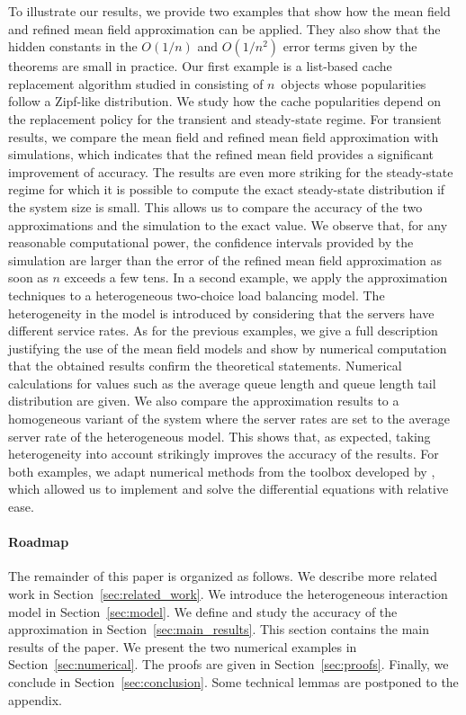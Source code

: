 \documentclass[acmsmall]{acmart}
\begin{document}
To illustrate our results, we provide two examples that show how the mean field and refined mean field approximation can be applied. They also show that the hidden constants in the $O(1/n)$ and $O(1/n^2)$ error terms given by the theorems are small in practice. Our first example is a list-based cache replacement algorithm studied in \cite{gastTransientSteadystateRegime2015} consisting of $n$~objects whose popularities follow a Zipf-like distribution. We study how the cache popularities depend on the replacement policy for the transient and steady-state regime. For transient results, we compare the mean field and refined mean field approximation with simulations, which indicates that the refined mean field provides a significant improvement of accuracy. The results are even more striking for the steady-state regime for which it is possible to compute the exact steady-state distribution if the system size is small. This allows us to compare the accuracy of the two approximations and the simulation to the exact value. We observe that, for any reasonable computational power, the confidence intervals provided by the simulation are larger than the error of the refined mean field approximation as soon as $n$ exceeds a few tens. In a second example, we apply the approximation techniques to a heterogeneous two-choice load balancing model. The heterogeneity in the model is introduced by considering that the servers have different service rates. As for the previous examples, we give a full description justifying the use of the mean field models and show by numerical computation that the obtained results confirm the theoretical statements. Numerical calculations for values such as the average queue length and queue length tail distribution are given. We also compare the approximation results to a homogeneous variant of the system where the server rates are set to the average server rate of the heterogeneous model. This shows that, as expected, taking heterogeneity into account strikingly improves the accuracy of the results. For both examples, we adapt numerical methods from the toolbox developed by \cite{allmeier2021rmftool}, which allowed us to implement and solve the differential equations with relative ease. 


\paragraph*{Roadmap} The remainder of this paper is organized as follows. We describe more related work in Section~\ref{sec:related_work}. We introduce the heterogeneous interaction model in Section~\ref{sec:model}. We define and study the accuracy of the approximation in Section~\ref{sec:main_results}. This section contains the main results of the paper. We present the two numerical examples in Section~\ref{sec:numerical}. The proofs are given in Section~\ref{sec:proofs}. Finally, we conclude in Section~\ref{sec:conclusion}.  Some technical lemmas are postponed to the appendix.
\end{document}
